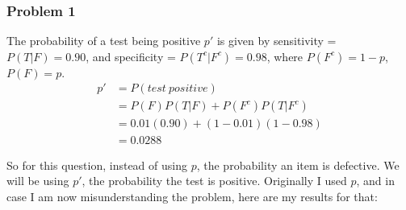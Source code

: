 \documentclass[11pt]{extarticle}
\DeclarePairedDelimiter\autobracket{(}{)}
\newcommand{\br}[1]{\autobracket*{#1}}
\begin{document}
\singlespacing




\subsubsection*{Problem 1}

The probability of a test being positive $p'$ is given by sensitivity = $P(T | F) = 0.90$, and specificity = $P(T^c | F^c) = 0.98$, where $P(F^c) = 1- p$, $P(F) = p$.\begin{align*}
p' & = P(test\ positive) \\
& = P(F)P(T|F) + P(F^c)P(T|F^c) \\
& = 0.01(0.90) + (1-0.01)(1 - 0.98)  \\
& = 0.0288
\end{align*}

So for this question, instead of using $p$, the probability an item is defective. We will be using $p'$, the probability the test is positive. Originally I used $p$, and in case I am now misunderstanding the problem, here are my results for that:
\end{document}
